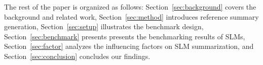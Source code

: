 
The rest of the paper is organized as follows: Section~\ref{sec:background} covers the background and related work, Section~\ref{sec:method} introduces reference summary generation, Section~\ref{sec:setup} illustrates the benchmark design, Section~\ref{sec:benchmark} presents presents the benchmarking results of SLMs, Section~\ref{sec:factor} analyzes the influencing factors on SLM summarization, and Section~\ref{sec:conclusion} concludes our findings.